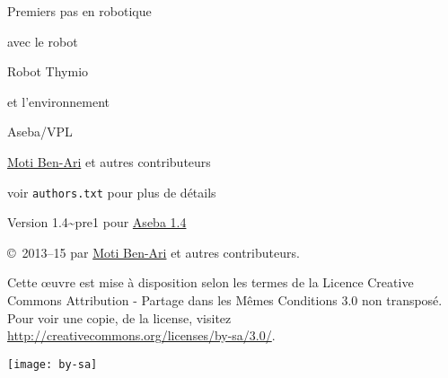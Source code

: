 \thispagestyle{empty}

\begin{center}
\begin{Huge}
\begin{bfseries}
Premiers pas en robotique
\end{bfseries}

avec le robot

\begin{bfseries}
Robot Thymio
\end{bfseries}

et l'environnement

\begin{bfseries}
Aseba/VPL
\end{bfseries}

\end{Huge}

\vskip 2cm

\begin{LARGE}
\href{http://www.weizmann.ac.il/sci-tea/benari/}{Moti Ben-Ari} et autres contributeurs\\
\end{LARGE}
\bigskip
\begin{Large}
voir \texttt{authors.txt} pour plus de détails
\end{Large}

\vskip 1cm

\begin{Large}
Version 1.4{\textasciitilde}pre1 pour \href{https://aseba.wikidot.com/fr:downloadinstall}{Aseba 1.4}
\end{Large}

\end{center}

\vfill

\begin{center}
\copyright{}\  2013--15 par \href{http://www.weizmann.ac.il/sci-tea/benari/}{Moti Ben-Ari} et autres contributeurs.
\end{center}

Cette œuvre est mise à disposition selon les termes de la Licence Creative Commons Attribution - Partage dans les Mêmes Conditions 3.0 non transposé.
Pour voir une copie, de la license, visitez \href{http://creativecommons.org/licenses/by-sa/3.0/deed.fr}{http://creativecommons.org/licenses/by-sa/3.0/}.

\begin{center}
\texttt{[image: by-sa]}
\end{center}

\newpage
\begin{spacing}{0.7}
\tableofcontents
\end{spacing}
\thispagestyle{empty}
\newpage
\setcounter{page}{1}
